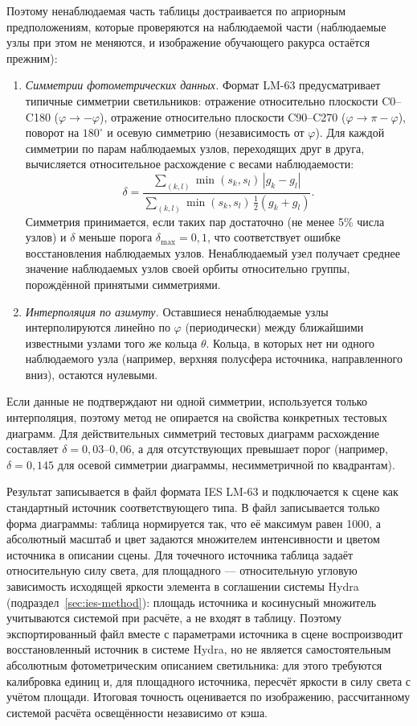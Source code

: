 Поэтому ненаблюдаемая часть таблицы достраивается по априорным предположениям, которые проверяются на наблюдаемой части (наблюдаемые узлы при этом не меняются, и изображение обучающего ракурса остаётся прежним):
\begin{enumerate}
    \item \emph{Симметрии фотометрических данных.} Формат LM-63 предусматривает типичные симметрии светильников: отражение относительно плоскости C0--C180 ($\varphi\to-\varphi$), отражение относительно плоскости C90--C270 ($\varphi\to\pi-\varphi$), поворот на $180^\circ$ и осевую симметрию (независимость от $\varphi$). Для каждой симметрии по парам наблюдаемых узлов, переходящих друг в друга, вычисляется относительное расхождение с весами наблюдаемости:
    \begin{equation}
    \delta=\frac{\sum_{(k,l)}\min(s_k,s_l)\,|g_k-g_l|}{\sum_{(k,l)}\min(s_k,s_l)\,\tfrac12(g_k+g_l)}.
    \end{equation}
    Симметрия принимается, если таких пар достаточно (не менее 5\% числа узлов) и $\delta$ меньше порога $\delta_{\max}=0,1$, что соответствует ошибке восстановления наблюдаемых узлов. Ненаблюдаемый узел получает среднее значение наблюдаемых узлов своей орбиты относительно группы, порождённой принятыми симметриями.
    \item \emph{Интерполяция по азимуту.} Оставшиеся ненаблюдаемые узлы интерполируются линейно по $\varphi$ (периодически) между ближайшими известными узлами того же кольца $\theta$. Кольца, в которых нет ни одного наблюдаемого узла (например, верхняя полусфера источника, направленного вниз), остаются нулевыми.
\end{enumerate}
Если данные не подтверждают ни одной симметрии, используется только интерполяция, поэтому метод не опирается на свойства конкретных тестовых диаграмм. Для действительных симметрий тестовых диаграмм расхождение составляет $\delta=0,03$--$0,06$, а для отсутствующих превышает порог (например, $\delta=0,145$ для осевой симметрии диаграммы, несимметричной по квадрантам).

Результат записывается в файл формата IES LM-63 и подключается к сцене как стандартный источник соответствующего типа. В файл записывается только форма диаграммы: таблица нормируется так, что её максимум равен 1000, а абсолютный масштаб и цвет задаются множителем интенсивности и цветом источника в описании сцены. Для точечного источника таблица задаёт относительную силу света, для площадного --- относительную угловую зависимость исходящей яркости элемента в соглашении системы Hydra (подраздел~\ref{sec:ies-method}): площадь источника и косинусный множитель учитываются системой при расчёте, а не входят в таблицу. Поэтому экспортированный файл вместе с параметрами источника в сцене воспроизводит восстановленный источник в системе Hydra, но не является самостоятельным абсолютным фотометрическим описанием светильника: для этого требуются калибровка единиц и, для площадного источника, пересчёт яркости в силу света с учётом площади. Итоговая точность оценивается по изображению, рассчитанному системой расчёта освещённости независимо от кэша.

